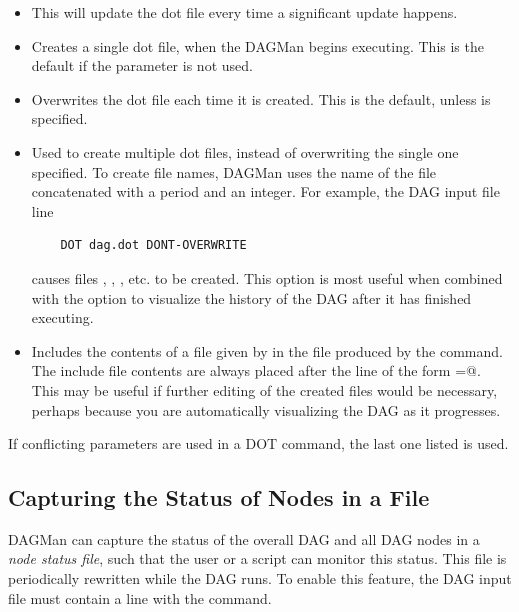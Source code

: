 \begin{itemize}

\item {}  This will update the dot file every time a
significant update happens. 

\item {} Creates a single dot file, when
the DAGMan begins executing. This is the default if the parameter
 is not used.

\item {} Overwrites the dot file each time it
is created. This is the default, unless 
is specified.

\item {} Used to create multiple dot files, instead
of overwriting the single one specified.
To create file names,
DAGMan uses the name of the file concatenated with a period and an
integer. For example, the DAG input file line
\begin{verbatim}
    DOT dag.dot DONT-OVERWRITE
\end{verbatim}
causes files
,
,
,
etc. to be created.
This option is
most useful when combined with the  option to
visualize the history of the DAG after it has finished executing. 

\item {} Includes the contents
of a file given by  in the file produced by the
 command.
The include file contents are always placed after the line of
the form
\verb@label=@.
This may be useful if further editing of the created files would
be necessary,
perhaps because you are automatically visualizing the DAG as it
progresses. 

\end{itemize}

If conflicting parameters are used in a DOT command, the last one
listed is used.

\subsection{\label{sec:DAG-node-status}Capturing the Status of Nodes in a File}

DAGMan can capture the status of the overall DAG and all DAG nodes
in a \emph{node status file},
such that the user or a script can monitor this status.
This file is periodically rewritten
while the DAG runs.
To enable this feature, the DAG input file must contain a line with the
 command.

